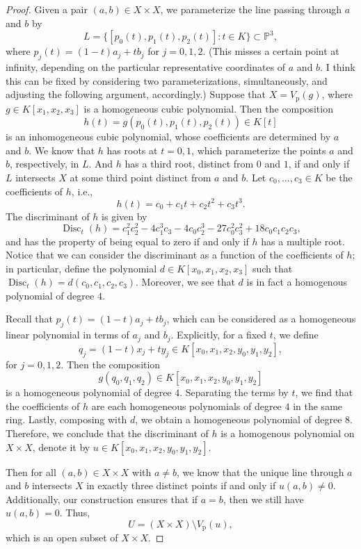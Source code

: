 \documentclass[12pt]{article}
\newcommand{\<}{\langle}
\renewcommand{\>}{\rangle}
\renewcommand{\P}{\mathbb{P}}
\newcommand{\Vp}{V_{\mathrm{p}}}
\begin{document}
\begin{proof}
    Given a pair $(a, b) \in X \times X$, we parameterize the line passing through $a$ and $b$ by
    \[
        L = \{[p_0(t), p_1(t), p_2(t)] : t \in K\} \subset \P^3,
    \]
    where $p_j(t) = (1 - t)a_j + tb_j$ for $j = 0, 1, 2$. (This misses a certain point at infinity, depending on the particular representative coordinates of $a$ and $b$. I think this can be fixed by considering two parameterizations, simultaneously, and adjusting the following argument, accordingly.) Suppose that $X = \Vp(g)$, where $g \in K[x_1, x_2, x_3]$ is a homogeneous cubic polynomial. Then the composition
    \[
        h(t) = g(p_0(t), p_1(t), p_2(t)) \in K[t]
    \]
    is an inhomogeneous cubic polynomial, whose coefficients are determined by $a$ and $b$. We know that $h$ has roots at $t = 0, 1$, which parameterize the points $a$ and $b$, respectively, in $L$. And $h$ has a third root, distinct from $0$ and $1$, if and only if $L$ intersects $X$ at some third point distinct from $a$ and $b$. Let $c_0, \dots, c_3 \in K$ be the coefficients of $h$, i.e.,
    \[
        h(t) = c_0 + c_1t + c_2t^2 + c_3t^3.
    \]
    The discriminant of $h$ is given by
    \[
        \operatorname{Disc}_t(h) = c_1^2c_2^2 - 4c_1^3c_3 - 4c_0c_2^3 - 27c_0^2c_3^2 + 18c_0c_1c_2c_3,
    \]
    and has the property of being equal to zero if and only if $h$ has a multiple root. Notice that we can consider the discriminant as a function of the coefficients of $h$; in particular, define the polynomial $d \in K[x_0, x_1, x_2, x_3]$ such that $\operatorname{Disc}_t(h) = d(c_0, c_1, c_2, c_3)$. Moreover, we see that $d$ is in fact a homogenous polynomial of degree $4$.

    Recall that $p_j(t) = (1 - t)a_j + tb_j$, which can be considered as a homogeneous linear polynomial in terms of $a_j$ and $b_j$. Explicitly, for a fixed $t$, we define
    \[
        q_j = (1-t)x_j + ty_j \in K[x_0, x_1, x_2, y_0, y_1, y_2],
    \]
    for $j = 0, 1, 2$. Then the composition
    \[
        g(q_0, q_1, q_2) \in K[x_0, x_1, x_2, y_0, y_1, y_2]
    \]
    is a homogeneous polynomial of degree $4$. Separating the terms by $t$, we find that the coefficients of $h$ are each homogeneous polynomials of degree $4$ in the same ring. Lastly, composing with $d$, we obtain a homogeneous polynomial of degree $8$. Therefore, we conclude that the discriminant of $h$ is a homogenous polynomial on $X \times X$, denote it by $u \in K[x_0, x_1, x_2, y_0, y_1, y_2]$.

    Then for all $(a, b) \in X \times X$ with $a \ne b$, we know that the unique line through $a$ and $b$ intersects $X$ in exactly three distinct points if and only if $u(a, b) \ne 0$. Additionally, our construction ensures that if $a = b$, then we still have $u(a, b) = 0$. Thus,
    \[
        U = (X \times X) \setminus  \Vp(u),
    \]
    which is an open subset of $X \times X$.

\end{proof}
\end{document}
